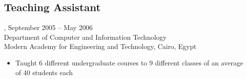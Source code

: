 \subsection{Teaching Assistant}, September 2005 -- May 2006\\
Department of Computer and Information Technology\\
Modern Academy for Engineering and Technology, Cairo, Egypt
\begin{itemize}
\item Taught 6 different undergraduate courses to 9 different classes of an average of 40 students each
\end{itemize}
